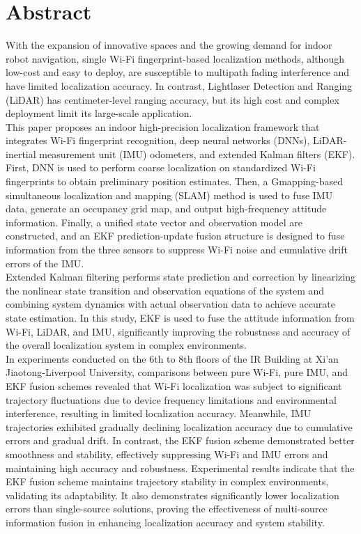 \documentclass[12pt,a4paper]{article}
\numberwithin{equation}{section}
\begin{document}
\section*{Abstract}
With the expansion of innovative spaces and the growing demand for indoor robot navigation, single Wi-Fi fingerprint-based localization methods, although low-cost and easy to deploy, are susceptible to multipath fading interference and have limited localization accuracy. In contrast, Lightlaser Detection and Ranging (LiDAR) has centimeter-level ranging accuracy, but its high cost and complex deployment limit its large-scale application.\\
This paper proposes an indoor high-precision localization framework that integrates Wi-Fi fingerprint recognition, deep neural networks (DNNs), LiDAR-inertial measurement unit (IMU) odometers, and extended Kalman filters (EKF). First, DNN is used to perform coarse localization on standardized Wi-Fi fingerprints to obtain preliminary position estimates. Then, a Gmapping-based simultaneous localization and mapping (SLAM) method is used to fuse IMU data, generate an occupancy grid map, and output high-frequency attitude information. Finally, a unified state vector and observation model are constructed, and an EKF prediction-update fusion structure is designed to fuse information from the three sensors to suppress Wi-Fi noise and cumulative drift errors of the IMU.\\
\noindent Extended Kalman filtering performs state prediction and correction by linearizing the nonlinear state transition and observation equations of the system and combining system dynamics with actual observation data to achieve accurate state estimation. In this study, EKF is used to fuse the attitude information from Wi-Fi, LiDAR, and IMU, significantly improving the robustness and accuracy of the overall localization system in complex environments.\\
In experiments conducted on the 6th to 8th floors of the IR Building at Xi'an Jiaotong-Liverpool University, comparisons between pure Wi-Fi, pure IMU, and EKF fusion schemes revealed that Wi-Fi localization was subject to significant trajectory fluctuations due to device frequency limitations and environmental interference, resulting in limited localization accuracy. Meanwhile, IMU trajectories exhibited gradually declining localization accuracy due to cumulative errors and gradual drift. In contrast, the EKF fusion scheme demonstrated better smoothness and stability, effectively suppressing Wi-Fi and IMU errors and maintaining high accuracy and robustness. Experimental results indicate that the EKF fusion scheme maintains trajectory stability in complex environments, validating its adaptability. It also demonstrates significantly lower localization errors than single-source solutions, proving the effectiveness of multi-source information fusion in enhancing localization accuracy and system stability.\\
\end{document}
